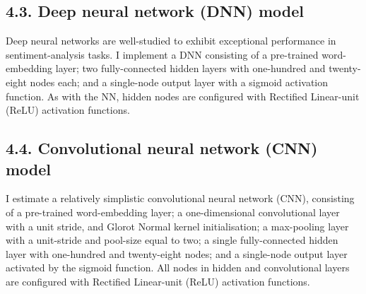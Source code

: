 \subsection*{4.3. Deep neural network (DNN) model}
Deep neural networks are well-studied to exhibit exceptional performance in sentiment-analysis tasks. I implement a DNN consisting of a pre-trained word-embedding layer; two fully-connected hidden layers with one-hundred and twenty-eight nodes each; and a single-node output layer with a sigmoid activation function. As with the NN, hidden nodes are configured with Rectified Linear-unit (ReLU) activation functions.

\subsection*{4.4. Convolutional neural network (CNN) model}
I estimate a relatively simplistic convolutional neural network (CNN), consisting of a pre-trained word-embedding layer; a one-dimensional convolutional layer with a unit stride, and Glorot Normal kernel initialisation; a max-pooling layer with a unit-stride and pool-size equal to two; a single fully-connected hidden layer with one-hundred and twenty-eight nodes; and a single-node output layer activated by the sigmoid function. All nodes in hidden and convolutional layers are configured with Rectified Linear-unit (ReLU) activation functions.


